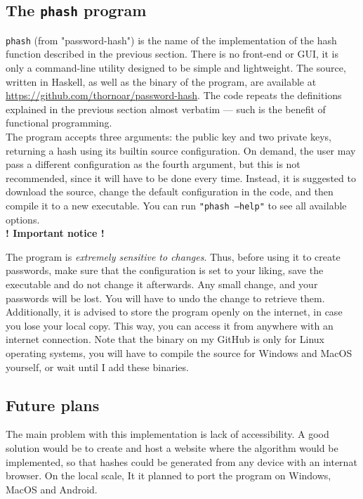 \documentclass[12pt, a4paper]{article}
\begin{document}
\subsection{The \texttt{phash} program}

\texttt{phash} (from "password-hash") is the name of the implementation of the hash function described in the previous section. There is no front-end or GUI, it is only a command-line utility designed to be simple and lightweight. The source, written in Haskell, as well as the binary of the program, are available at \url{https://github.com/thornoar/password-hash}. The code repeats the definitions explained in the previous section almost verbatim --- such is the benefit of functional programming.\\

The program accepts three arguments: the public key and two private keys, returning a hash using its builtin source configuration. On demand, the user may pass a different configuration as the fourth argument, but this is not recommended, since it will have to be done every time. Instead, it is suggested to download the source, change the default configuration in the code, and then compile it to a new executable. You can run \texttt{"phash ---help"} to see all available options.\\

\textbf{! Important notice !}

The program is \emph{extremely sensitive to changes}. Thus, before using it to create passwords, make sure that the configuration is set to your liking, save the executable and do not change it afterwards. Any small change, and your passwords will be lost. You will have to undo the change to retrieve them. Additionally, it is advised to store the program openly on the internet, in case you lose your local copy. This way, you can access it from anywhere with an internet connection. Note that the binary on my GitHub is only for Linux operating systems, you will have to compile the source for Windows and MacOS yourself, or wait until I add these binaries.

\subsection{Future plans}

The main problem with this implementation is lack of accessibility. A good solution would be to create and host a website where the algorithm would be implemented, so that hashes could be generated from any device with an internat browser. On the local scale, It it planned to port the program on Windows, MacOS and Android.
\end{document}

